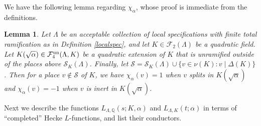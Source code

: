 \documentclass[10pt]{article}
\theoremstyle{plain}
\newtheorem{lemma}[thm]{Lemma}
\theoremstyle{definition}
\theoremstyle{remark}
\def\un{{\rm un}}
\def\val{{\nu}}
\def\Q{{\mathbb Q}}
\def\Q{{\mathbb Q}}
\def\cF{{\mathcal F}}
\def\cS{{\mathcal S}}
\begin{document}
We have the following lemma regarding $\chi_\alpha$, whose proof is
immediate from the definitions.
\begin{lemma}\label{lemspV4}
Let $\Lambda$ be an acceptable collection of local 
specifications with finite total ramification as in Definition \ref{localspec}, and let $K \in
\cF_2(\Lambda)$ be a quadratic field. Let $K(\sqrt{\alpha}) \in
\cF_4^{\un}(\Lambda,K)$ be a quadratic extension of $K$ that is
unramified outside of the places above $\cS_K(\Lambda)$.  Finally, let $\cS = \cS_K(\Lambda) \cup \{v \in \val(K) : v\mid\Delta(K)\}$. Then for a place $v\not\in \cS$ of $K$, we
have $\chi_\alpha(v)=1$ when $v$ splits in $K(\sqrt{\alpha})$ and
$\chi_\alpha(v)=-1$ when $v$ is inert in $K(\sqrt{\alpha})$.
\end{lemma}

Next we describe the functions $L_{\Lambda,\Q}(s;K,\alpha)$ and
$L_{\Lambda,K}(t;\alpha)$ in terms of  ``completed'' Hecke $L$-functions,
and list their conductors.
\end{document}
